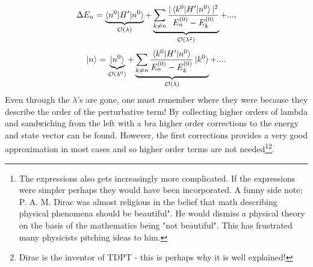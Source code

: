 \begin{equation}
	\Delta E_n=\underbrace{\braket{n^0|H'|n^0}}_{\mathcal{O}(\lambda)}+\underbrace{\sum_{k\neq n}\frac{|\braket{k^0|H'|n^0}|^2}{E_n^{(0)}-E_k^{(0)}}}_{\mathcal{O}(\lambda^2)}+...,
	\label{correction energy}
\end{equation} 
\begin{equation}
	\ket{n}=\underbrace{\ket{n^0}}_{\mathcal{O}(\lambda^0)}+\underbrace{\sum_{k\neq n}^{}\frac{\braket{k^0|H'|n^0}}{E_n^{(0)}-E_{k}^{(0)}}\ket{k^0}}_{\mathcal{O}(\lambda)}+....
	\label{correction state}
\end{equation} 
Even through the $\lambda$'s are gone, one must remember where they were because they describe the order of the perturbative term! By collecting higher orders of lambda and sandwiching from the left with a bra higher order corrections to the energy and state vector can be found. However, the first corrections provides a very good approximation in most cases and so higher order terms are not needed\footnote{The expressions also gets increasingly more complicated. If the expressions were simpler perhaps they would have been incorporated. A funny side note: P. A. M. Dirac was almost religious in the belief that math describing physical phenomena should be beautiful". He would dismiss a physical theory on the basis of the mathematics being "not beautiful". This has frustrated many physicists pitching ideas to him.}\footnote{Dirac is the inventor of TDPT - this is perhaps why it is well explained!}.

